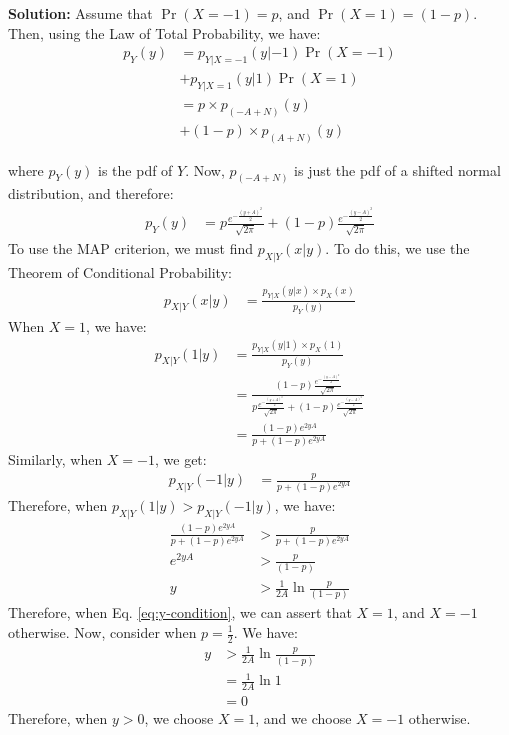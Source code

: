 \documentclass[journal,12pt,twocolumn]{IEEEtran}
\newcommand{\solution}{\noindent \textbf{Solution: }}
\providecommand{\pr}[1]{\ensuremath{\Pr\left(#1\right)}}
\numberwithin{equation}{section}
\renewcommand\thesection{\arabic{section}}
\begin{document}
\begin{enumerate}[label=\thesection.\arabic*,ref=\thesection.\theenumi]
	\solution Assume that $\pr{X = -1} = p$, and $\pr{X = 1} = (1-p)$. Then, using the Law of Total Probability,
we have:
\begin{align}
\nonumber p_Y(y) &= p_{Y|X = -1}(y|-1) \pr{X = -1} \\
&+ p_{Y| X = 1}(y|1) \pr{X = 1} \\
\nonumber &= p \times p_{(-A + N)}(y) \\
&+ (1-p) \times p_{(A+N)} (y) 
\end{align}
 
where $p_Y(y)$ is the pdf of $Y$. Now, $p_{(-A + N)}$ is just the pdf of a shifted
normal distribution, and therefore:
\begin{align}
    p_Y(y) &=  p \frac{e^{-\frac{(y+A)^2}{2}}}{\sqrt{2\pi}} + \left(1-p\right) \frac{e^{-\frac{(y-A)^2}{2}}}{\sqrt{2\pi}}
\end{align}
To use the MAP criterion, we must find $p_{X|Y}(x|y)$. To do this, we use the Theorem of Conditional Probability:
\begin{align}
    p_{X|Y}(x|y) &= \frac{p_{Y|X}(y|x) \times p_X(x)}{p_Y(y)}
\end{align}
When $X=1$, we have:
\begin{align}
    p_{X|Y}(1|y) &= \frac{p_{Y|X}(y|1) \times p_X(1)}{p_Y(y)} \\
    &= \frac{\left(1-p\right) \frac{e^{-\frac{(y-A)^2}{2}}}{\sqrt{2\pi}}}{ p \frac{e^{-\frac{(y+A)^2}{2}}}{\sqrt{2\pi}} + \left(1-p\right) \frac{e^{-\frac{(y-A)^2}{2}}}{\sqrt{2\pi}}} \\
    &= \frac{\left(1-p\right) e^{2yA}}{p + \left(1-p\right) e^{2yA}}
\end{align}
Similarly, when $X = -1$, we get:
\begin{align}
    p_{X|Y}(-1|y) &= \frac{p}{p + \left(1-p\right) e^{2yA}} 
\end{align}
Therefore, when $ p_{X|Y}(1|y) >  p_{X|Y}(-1|y)$, we have:
\begin{align}
    \frac{\left(1-p\right) e^{2yA}}{p + \left(1-p\right) e^{2yA}} &> \frac{p}{p + \left(1-p\right) e^{2yA}} \\
    e^{2yA} &> \frac{p}{\left(1-p\right)} \\
    \label{eq:y-condition}
    y &> \frac{1}{2A} \ln{\frac{p}{\left(1-p\right)}}
\end{align}
Therefore, when Eq. \eqref{eq:y-condition}, we can assert that $X = 1$, and $X = -1$ otherwise.
Now, consider when $p = \frac{1}{2} $.
We have:
\begin{align}
    y &> \frac{1}{2A} \ln{\frac{p}{\left(1-p\right)}} \\
    &= \frac{1}{2A} \ln{1} \\
    &= 0
\end{align}
Therefore, when $y > 0$, we choose $X = 1$, and we choose $X = -1$ otherwise.

	\end{enumerate}
\end{document}
